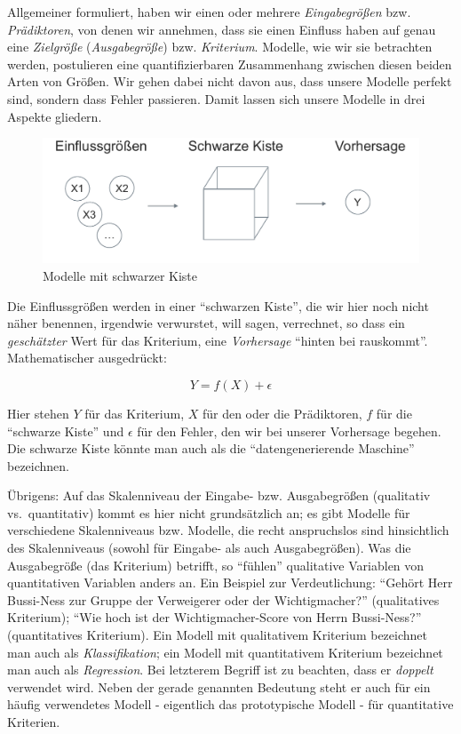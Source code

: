 \documentclass[12pt,]{book}
\begin{document}
Allgemeiner formuliert, haben wir einen oder mehrere
\emph{Eingabegrößen} bzw.
\emph{Prädiktoren}, von denen wir annehmen, dass sie
einen Einfluss haben auf genau eine \emph{Zielgröße}
(\emph{Ausgabegröße}) bzw. \emph{Kriterium}. Modelle,
wie wir sie betrachten werden, postulieren eine quantifizierbaren
Zusammenhang zwischen diesen beiden Arten von Größen. Wir gehen dabei
nicht davon aus, dass unsere Modelle perfekt sind, sondern dass Fehler
passieren. Damit lassen sich unsere Modelle in drei Aspekte gliedern.

\begin{figure}

{\centering \includegraphics[width=0.7\linewidth]{images/Modell_Blackbox} 

}

\caption{Modelle mit schwarzer Kiste}\label{fig:fig-blackbox}
\end{figure}

Die Einflussgrößen werden in einer ``schwarzen Kiste'', die wir hier
noch nicht näher benennen, irgendwie verwurstet, will sagen, verrechnet,
so dass ein \emph{geschätzter} Wert für das Kriterium, eine
\emph{Vorhersage} ``hinten bei rauskommt''. Mathematischer ausgedrückt:

\[Y = f(X) + \epsilon\]

Hier stehen \(Y\) für das Kriterium, \(X\) für den oder die Prädiktoren,
\(f\) für die ``schwarze Kiste'' und \(\epsilon\) für den Fehler, den
wir bei unserer Vorhersage begehen. Die schwarze Kiste könnte man auch
als die ``datengenerierende Maschine'' bezeichnen.

Übrigens: Auf das Skalenniveau der Eingabe- bzw. Ausgabegrößen
(qualitativ vs.~quantitativ) kommt es hier nicht grundsätzlich an; es
gibt Modelle für verschiedene Skalenniveaus bzw. Modelle, die recht
anspruchslos sind hinsichtlich des Skalenniveaus (sowohl für Eingabe-
als auch Ausgabegrößen). Was die Ausgabegröße (das Kriterium) betrifft,
so ``fühlen'' qualitative Variablen von quantitativen Variablen anders
an. Ein Beispiel zur Verdeutlichung: ``Gehört Herr Bussi-Ness zur Gruppe
der Verweigerer oder der Wichtigmacher?'' (qualitatives Kriterium);
``Wie hoch ist der Wichtigmacher-Score von Herrn Bussi-Ness?''
(quantitatives Kriterium). Ein Modell mit qualitativem Kriterium
bezeichnet man auch als \emph{Klassifikation}; ein
Modell mit quantitativem Kriterium bezeichnet man auch als
\emph{Regression}. Bei letzterem Begriff ist zu
beachten, dass er \emph{doppelt} verwendet wird. Neben der gerade
genannten Bedeutung steht er auch für ein häufig verwendetes Modell -
eigentlich das prototypische Modell - für quantitative Kriterien.
\end{document}
